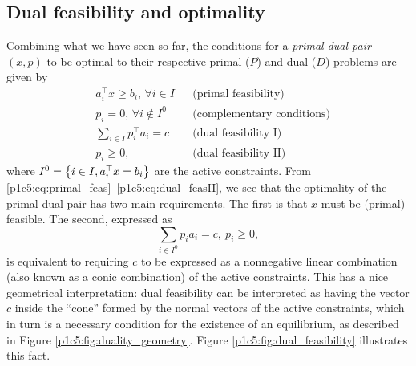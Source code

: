 \subsection{Dual feasibility and optimality}

Combining what we have seen so far, the conditions for a \emph{primal-dual pair} $(x,p)$ to be optimal to their respective primal ($P$) and dual ($D$) problems are given by 
%
\begin{align}
	& a_i^\top x \geq b_i, \, \forall i \in I & & \text{(primal feasibility)}\label{p1c5:eq:primal_feas} \\
	& p_i = 0, \, \forall i \notin I^0   & & \text{(complementary conditions)} \label{p1c5:eq:cc}\\
	& \sum_{i \in I} p_i^\top a_i = c & & \text{(dual feasibility I)} \label{p1c5:eq:dual_feasI} \\
	& p_i \geq 0, & & \text{(dual feasibility II)} \label{p1c5:eq:dual_feasII}
\end{align}
%
where $I^0 = \left\{ i \in I, a_i^\top x = b _i \right \}$ are the active constraints. From \eqref{p1c5:eq:primal_feas}--\eqref{p1c5:eq:dual_feasII}, we see that the optimality of the primal-dual pair has two main requirements. The first is that $x$ must be (primal) feasible. The second, expressed as 
%
\begin{equation*}
	\sum_{i \in I^0} p_ia_i = c, \ p_i \geq 0,
\end{equation*}
%
is equivalent to requiring $c$ to be expressed as a nonnegative linear combination (also known as a conic combination) of the active constraints. This has a nice geometrical interpretation: dual feasibility can be interpreted as having the vector $c$ inside the ``cone'' formed by the normal vectors of the active constraints, which in turn is a necessary condition for the existence of an equilibrium, as described in Figure \ref{p1c5:fig:duality_geometry}. Figure \ref{p1c5:fig:dual_feasibility} illustrates this fact.

